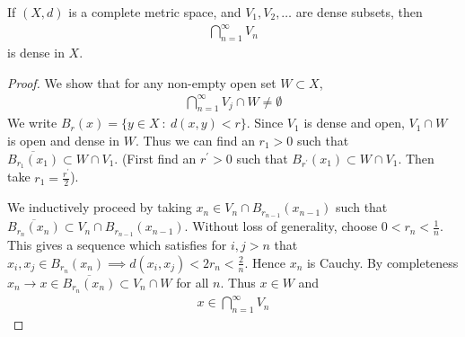 \begin{theorem}
  If $(X, d)$ is a complete metric space, and $V_1 , V_2 , \ldots$
  are dense subsets, then
  \begin{align*}
    \bigcap_{n = 1}^{\infty} V_n
  \end{align*}
  is dense in $X$.
\end{theorem}
\begin{proof}
  We show that for any non-empty open set $W \subset X$,
  \begin{align*}
    \bigcap_{n = 1}^{\infty} V_j \cap W \neq \emptyset
  \end{align*}
  We write $B_r(x) = \{ y \in X  \ : \  d(x, y)< r \}$. Since $V_1$
  is dense and open, $V_{1} \cap W$ is open and dense in $W$. Thus we
  can find an $r_{1} > 0$ such that $\overline{B_{r_{1}}(x_1)}
  \subset W \cap V_1$. (First find an $r^\prime > 0$ such that
    $B_{r^\prime}(x_1) \subset W \cap V_{1}$. Then take $r_{1} =
  \frac{r^\prime}{2}$).

  We inductively proceed by taking $x_n \in V_n \cap
  B_{r_{n-1}}(x_{n-1})$ such that $\overline{B_{r_n}(x_n)} \subset
  V_n \cap B_{r_{n-1}}(x_{n-1})$. Without loss of generality, choose
  $0 < r_n < \frac{1}{n}$. This gives a sequence which satisfies for
  $i, j > n$ that $x_i, x_j \in B_{r_n}(x_n) \implies d(x_i, x_j) <
  2r_n < \frac{2}{n}$. Hence $x_n$ is Cauchy. By completeness $x_n
  \to x \in \overline{B_{r_n}(x_n)} \subset V_n \cap W$ for all $n$.
  Thus $x \in W$ and
  \begin{align*}
    x \in \bigcap_{n = 1}^{\infty}V_n
  \end{align*}
\end{proof}
